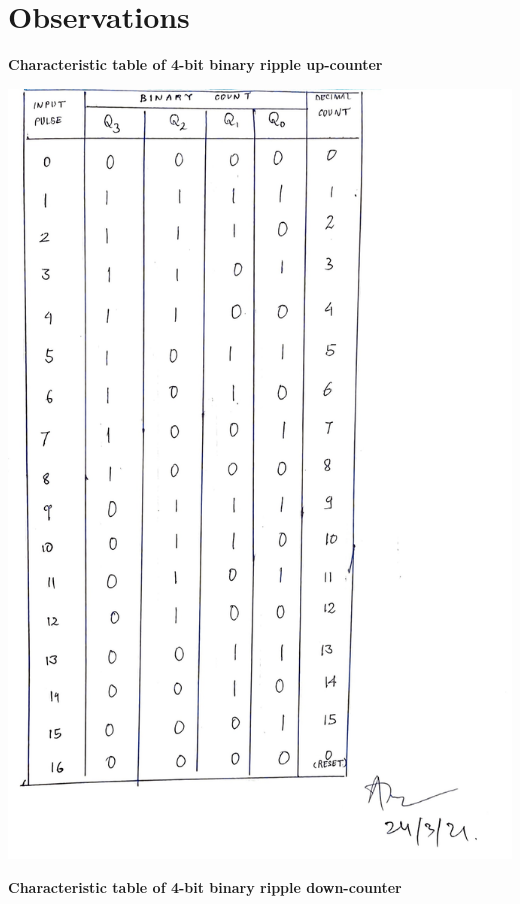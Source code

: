 \section{Observations}
\begin{center}
    \textbf{Characteristic table of 4-bit binary ripple up-counter}
\end{center}
\begin{center}
    \includegraphics[scale = 0.15]{Figures/tabup_1.jpg}
\end{center}
\begin{center}
    \textbf{Characteristic table of 4-bit binary ripple down-counter}
\end{center}
